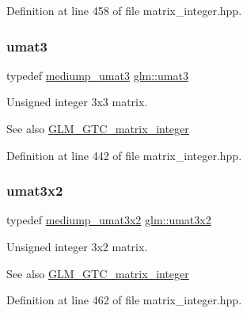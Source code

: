 Definition at line 458 of file matrix\+\_\+integer.\+hpp.

\mbox{\label{group__gtc__matrix__integer_ga8b8fbc858e28abf8fc344744f8d6d368}} 
\subsubsection{\texorpdfstring{umat3}{umat3}}
{\footnotesize\ttfamily typedef \mbox{\hyperlink{group__gtc__matrix__integer_ga953d4cb3e70d85567756b3fbcca0e9e9}{mediump\+\_\+umat3}} \mbox{\hyperlink{group__gtc__matrix__integer_ga8b8fbc858e28abf8fc344744f8d6d368}{glm\+::umat3}}}

Unsigned integer 3x3 matrix. \begin{DoxySeeAlso}{See also}
\mbox{\hyperlink{group__gtc__matrix__integer}{G\+L\+M\+\_\+\+G\+T\+C\+\_\+matrix\+\_\+integer}} 
\end{DoxySeeAlso}


Definition at line 442 of file matrix\+\_\+integer.\+hpp.

\mbox{\label{group__gtc__matrix__integer_ga257300f2710612877ef45438a366e308}} 
\subsubsection{\texorpdfstring{umat3x2}{umat3x2}}
{\footnotesize\ttfamily typedef \mbox{\hyperlink{group__gtc__matrix__integer_ga62243caa5b85b1cf91021ce6ffc21183}{mediump\+\_\+umat3x2}} \mbox{\hyperlink{group__gtc__matrix__integer_ga257300f2710612877ef45438a366e308}{glm\+::umat3x2}}}

Unsigned integer 3x2 matrix. \begin{DoxySeeAlso}{See also}
\mbox{\hyperlink{group__gtc__matrix__integer}{G\+L\+M\+\_\+\+G\+T\+C\+\_\+matrix\+\_\+integer}} 
\end{DoxySeeAlso}


Definition at line 462 of file matrix\+\_\+integer.\+hpp.

\mbox{\label{group__gtc__matrix__integer_gab80b6501ba1b2c40119a0f2d256f4c97}} 

